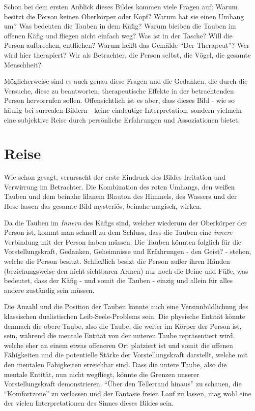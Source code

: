 \documentclass[a4paper, 12pt]{article}
\begin{document}
Schon bei dem ersten Anblick dieses Bildes kommen viele Fragen auf: Warum besitzt die Person keinen Oberkörper oder Kopf? Warum hat sie einen Umhang um? Was bedeuten die Tauben in dem Käfig? Warum bleiben die Tauben im offenen Käfig und fliegen nicht einfach weg? Was ist in der Tasche? Will die Person aufbrechen, entfliehen? Warum heißt das Gemälde \enquote{Der Therapeut}? Wer wird hier therapiert? Wir als Betrachter, die Person selbst, die Vögel, die gesamte Menschheit?

Möglicherweise sind es auch genau diese Fragen und die Gedanken, die durch die Versuche, diese zu beantworten, therapeutische Effekte in der betrachtenden Person hervorrufen sollen. Offensichtlich ist es aber, dass dieses Bild - wie so häufig bei surrealen Bildern - keine eindeutige Interpretation, sondern vielmehr eine subjektive Reise durch persönliche Erfahrungen und Assoziationen bietet.

\section{Reise}
Wie schon gesagt, verursacht der erste Eindruck des Bildes Irritation und Verwirrung im Betrachter. Die Kombination des roten Umhangs, den weißen Tauben und dem beinahe lilanem Blauton des Himmels, des Wassers und der Hose lassen das gesamte Bild mysteriös, beinahe magisch, wirken.

Da die Tauben im \textit{Innern} des Käfigs sind, welcher wiederum der Oberkörper der Person ist, kommt man schnell zu dem Schluss, dass die Tauben eine \textit{innere} Verbindung mit der Person haben müssen. Die Tauben könnten folglich für die Vorstellungskraft, Gedanken, Geheimnisse und Erfahrungen - den Geist? - stehen, welche die Person besitzt. Schließlich besizt die Person außer ihren Händen (beziehungsweise den nicht sichtbaren Armen) nur noch die Beine und Füße, was bedeutet, dass der Käfig - und somit die Tauben - einzig und allein für alles andere zuständig sein müssen.

Die Anzahl und die Position der Tauben könnte auch eine Versinnbildlichung des klassischen dualistischen Leib-Seele-Problems sein. Die physische Entität könnte demnach die obere Taube, also die Taube, die weiter im Körper der Person ist, sein, während die mentale Entität von der unteren Taube repräsentiert wird, welche eher an einem etwas offeneren Ort platziert ist und somit die offenen Fähigkeiten und die potentielle Stärke der Vorstellungskraft darstellt, welche mit den mentalen Fähigkeiten erreichbar sind. Dass die untere Taube, also die mentale Entität, nun nicht wegfliegt, könnte die Grenzen unserer Vorstellungskraft demonstrieren. \enquote{Über den Tellerrand hinaus} zu schauen, die \enquote{Komfortzone} zu verlassen und der Fantasie freien Lauf zu lassen, mag wohl eine der vielen Interpretationen des Sinnes dieses Bildes sein.
\end{document}
